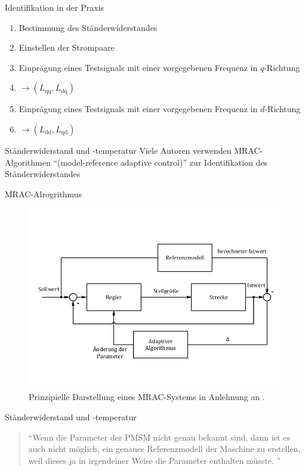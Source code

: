 \documentclass{beamer}
\newcommand{\x}[1]{\mathrm{#1}}
\begin{document}
\begin{frame}{Identifikation in der Praxis}
\begin{enumerate}
	\item Bestimmung des Ständerwiderstandes
	\item Einstellen der Strompaare
	\item Einprägung eines Testsignals mit einer vorgegebenen Frequenz in $q$-Richtung
	\item $\rightarrow (L_\x{qq},L_\x{dq})$
	\item Einprägung eines Testsignals mit einer vorgegebenen Frequenz in $d$-Richtung
	\item $\rightarrow (L_\x{dd},L_\x{qd})$
\end{enumerate}
\end{frame}

\begin{frame}{Ständerwiderstand und -temperatur}
Viele Autoren verwenden MRAC-Algorithmen \enquote{(model-reference adaptive control)} zur Identifikation des Ständerwiderstandes
\end{frame}

\begin{frame}[plain]{MRAC-Alrogrithmus}
\begin{figure}[h!]
	\centering
	\includegraphics[width=\columnwidth]{img/mrac}
	\caption{Prinzipielle Darstellung eines MRAC-Systems in Anlehnung an \textcite{slotine_applied_1991}.}
	\label{fig:mrac}
\end{figure}
\end{frame}

\begin{frame}{Ständerwiderstand und -temperatur}
\begin{quote}
\enquote{Wenn die Parameter der PMSM nicht genau bekannt sind, dann ist es auch nicht möglich, ein genaues Referenzmodell der Maschine zu erstellen, weil dieses ja in irgendeiner Weise die Parameter enthalten müsste. \autocite[S.~139]{Kellner2012}}
\end{quote}
\end{frame}
\end{document}
